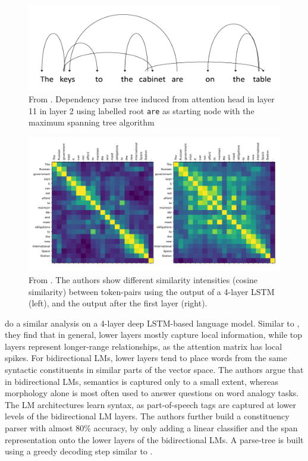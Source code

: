 \documentclass[a4paper,12pt,oneside,openright]{report}
\begin{document}
\begin{figure}
	\center
  \includegraphics[width=0.7\linewidth]{./assets/relatedwork/BERT_dependency_parsing.png}
  \caption{From \cite{jawahar19}. Dependency parse tree induced from attention head in layer 11 in layer 2 using labelled root \texttt{are} as starting node with the maximum spanning tree algorithm}
  \label{fig:parse_tree_jawahar}
\end{figure}

\begin{figure}
	\center
  \includegraphics[width=0.9\linewidth]{./assets/relatedwork/self_attention_analysis.png}
  \caption{From \cite{peters18}. The authors show different similarity intensities (cosine similarity) between token-pairs using the output of a 4-layer LSTM (left), and the output after the first layer (right).}
  \label{fig:embeddings_by_language}
\end{figure}

\cite{peters18} do a similar analysis on a 4-layer deep LSTM-based language model. 
Similar to \cite{jawahar19}, they find that in general, lower layers mostly capture local information, while top layers represent longer-range relationships, as the attention matrix has local spikes.
For bidirectional LMs, lower layers tend to place words from the same syntactic constituents in similar parts of the vector space.
The authors argue that in bidirectional LMs, semantics is captured only to a small extent, whereas morphology alone is most often used to answer questions on word analogy tasks.
The LM architectures learn syntax, as part-of-speech tags are captured at lower levels of the bidirectional LM layers.
The authors further build a constituency parser with almost 80\% accuracy, by only adding a linear classifier and the span representation onto the lower layers of the bidirectional LMs.
A parse-tree is built using a greedy decoding step similar to \cite{joshi19b}. \\
 
\end{document}
